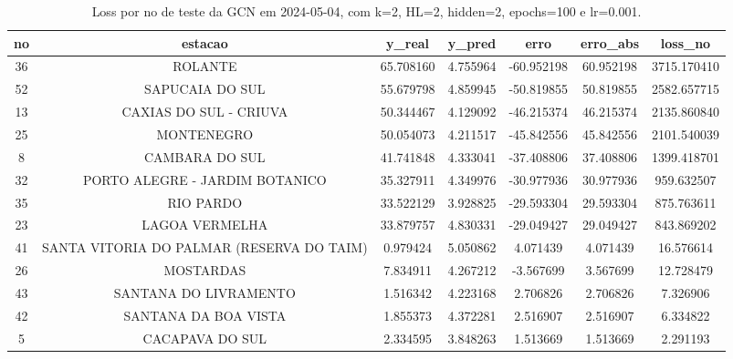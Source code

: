 \begin{table}[h]
\centering
\caption{Loss por no de teste da GCN em 2024-05-04, com k=2, HL=2, hidden=2, epochs=100 e lr=0.001.}
\label{tab:gcn_loss_k2_hl2_h2_e100_d20240504}
\begin{tabular}{ccccccc}
\toprule
no & estacao & y\_real & y\_pred & erro & erro\_abs & loss\_no \\
\midrule
36 & ROLANTE & 65.708160 & 4.755964 & -60.952198 & 60.952198 & 3715.170410 \\
52 & SAPUCAIA DO SUL & 55.679798 & 4.859945 & -50.819855 & 50.819855 & 2582.657715 \\
13 & CAXIAS DO SUL - CRIUVA & 50.344467 & 4.129092 & -46.215374 & 46.215374 & 2135.860840 \\
25 & MONTENEGRO & 50.054073 & 4.211517 & -45.842556 & 45.842556 & 2101.540039 \\
8 & CAMBARA DO SUL & 41.741848 & 4.333041 & -37.408806 & 37.408806 & 1399.418701 \\
32 & PORTO ALEGRE - JARDIM BOTANICO & 35.327911 & 4.349976 & -30.977936 & 30.977936 & 959.632507 \\
35 & RIO PARDO & 33.522129 & 3.928825 & -29.593304 & 29.593304 & 875.763611 \\
23 & LAGOA VERMELHA & 33.879757 & 4.830331 & -29.049427 & 29.049427 & 843.869202 \\
41 & SANTA VITORIA DO PALMAR (RESERVA DO TAIM) & 0.979424 & 5.050862 & 4.071439 & 4.071439 & 16.576614 \\
26 & MOSTARDAS & 7.834911 & 4.267212 & -3.567699 & 3.567699 & 12.728479 \\
43 & SANTANA DO LIVRAMENTO & 1.516342 & 4.223168 & 2.706826 & 2.706826 & 7.326906 \\
42 & SANTANA DA BOA VISTA & 1.855373 & 4.372281 & 2.516907 & 2.516907 & 6.334822 \\
5 & CACAPAVA DO SUL & 2.334595 & 3.848263 & 1.513669 & 1.513669 & 2.291193 \\
\bottomrule
\end{tabular}
\end{table}

